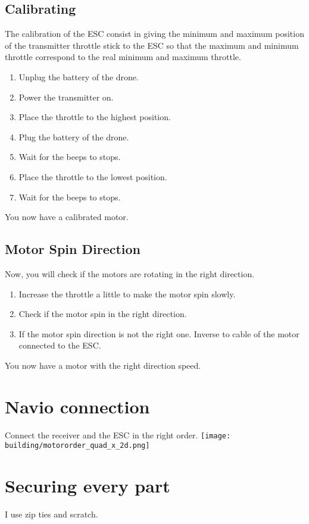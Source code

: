 \subsection{Calibrating}
The calibration of the ESC consist in giving the minimum and maximum position of the transmitter throttle stick to the ESC so that the maximum and minimum throttle correspond to the real minimum and maximum throttle.

\begin{enumerate}
    \item Unplug the battery of the drone.
    \item Power the transmitter on.
    \item Place the throttle to the highest position.
    \item Plug the battery of the drone.
    \item Wait for the beeps to stops.
    \item Place the throttle to the lowest position.
    \item Wait for the beeps to stops.
\end{enumerate}
You now have a calibrated motor.


\subsection{Motor Spin Direction}
Now, you will check if the motors are rotating in the right direction.

\begin{enumerate}
    \item Increase the throttle a little to make the motor spin slowly.
    \item Check if the motor spin in the right direction.
    \item If the motor spin direction is not the right one. Inverse to cable of the motor connected to the ESC.
\end{enumerate}

You now have a motor with the right direction speed.

\section{Navio connection}
Connect the receiver and the ESC in the right order.
\texttt{[image: building/motororder\_quad\_x\_2d.png]}

\section{Securing every part}
I use zip ties and scratch.


